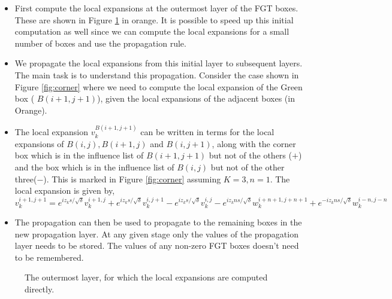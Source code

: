 \begin{itemize}
\item First compute the local expansions at the outermost layer of the FGT boxes. These are shown in Figure \ref{fig:outer} in orange. It is possible to speed up this initial computation as well since we can compute the local expansions for a small number of boxes and use the propagation rule.
\item We propagate the local expansions from this initial layer to subsequent layers. The main task is to understand this propagation. Consider the case shown in Figure \ref{fig:corner} where we need to compute the local expansion of the Green box ( $B(i+1,j+1)$), given the local expansions of the adjacent boxes (in Orange).
\item The local expansion $v_k^{B(i+1, j+1)}$ can be written in terms for the local expansions of $B(i,j), B(i+1,j)$ and $B(i,j+1)$, along with the corner box which is in the influence list of $B(i+1, j+1)$ but not of the others ($+$) and the box which is in the influence list of $B(i,j)$ but not of the other three($-$). This is marked in Figure \ref{fig:corner} assuming $K=3, n=1$. The local expansion is given by,
\[
	v_k^{i+1,j+1} = e^{iz_k s/\sqrt{\delta}} v_k^{i+1,j} + e^{iz_k s/\sqrt{\delta}} v_k^{i,j+1}
					- e^{iz_k s/\sqrt{\delta}} v_k^{i,j} - e^{iz_k ns/\sqrt{\delta}} w_k^{i+n+1,j+n+1} + e^{-iz_k ns/\sqrt{\delta}} w_k^{i-n,j-n}
\]
\item The propagation can then be used to propagate to the remaining boxes in the new propagation layer. At any given stage only the values of the propagation layer needs to be stored. The values of any non-zero FGT boxes doesn't need to be remembered.

\end{itemize}

\begin{figure}[h]
\centering
{}
\caption{\small The outermost layer, for which the local expansions are computed directly. 
}
\label{fig:outer}
\end{figure}



